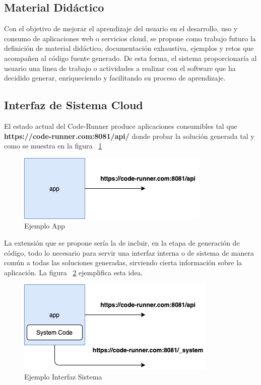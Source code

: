 \documentclass[a4paper,11pt]{book}
\begin{document}
\subsection{Material Didáctico}

Con el objetivo de mejorar el aprendizaje del usuario en el desarrollo, uso y consumo de aplicaciones web o servicios cloud, se propone como trabajo futuro la definición de material didáctico, documentación exhaustiva, ejemplos y retos que acompañen al código fuente generado. De esta forma, el sistema proporcionaría al usuario una linea de trabajo o actividades a realizar con el software que ha decidido generar, enriqueciendo y facilitando su proceso de aprendizaje. 

\subsection{Interfaz de Sistema Cloud}


El estado actual del Code-Runner produce aplicaciones consumibles tal que  \textbf{ https://code-runner.com:8081/api/}  donde probar la solución generada tal y como se muestra en la figura ~\ref{sc_1}

   \begin{figure}[H]
\centering
\includegraphics[scale=0.75]{imagenes/api.png}
\caption{ Ejemplo App  }
\label{sc_1}
\end{figure}

La extensión que se propone sería la de incluir, en la etapa de generación de código, todo lo necesario para servir una interfaz interna o de sistema de manera común a todas las soluciones generadas, sirviendo  cierta información sobre la aplicación. La figura ~\ref{sc_2} ejemplifica esta idea. 


\begin{figure}[H]
\centering
\includegraphics[scale=0.75]{imagenes/system.png}
\caption{ Ejemplo Interfaz Sistema  }
\label{sc_2}
\end{figure}
\end{document}
